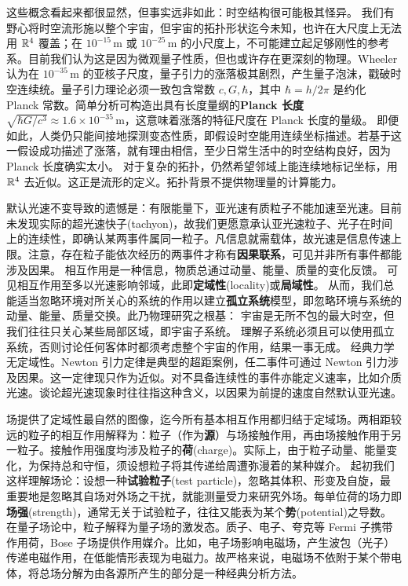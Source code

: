 这些概念看起来都很显然，但事实远非如此：时空结构很可能极其怪异。
我们有野心将时空流形施以整个宇宙，但宇宙的拓扑形状迄今未知，也许在大尺度上无法用 $\mathbb{R}^4$ 覆盖；在 $10^{-15}$\,m 或 $10^{-25}$\,m 的小尺度上，不可能建立起足够刚性的参考系。目前我们认为这是因为微观量子性质，但也或许存在更深刻的物理。Wheeler 认为在 $10^{-35}$\,m 的亚核子尺度，量子引力的涨落极其剧烈，产生量子泡沫，戳破时空连续统。量子引力理论必须一致包含常数 $c,G,\hbar$，其中 $\hbar=h/2\pi$ 是约化 Planck 常数。简单分析可构造出具有长度量纲的\textbf{Planck 长度} $\sqrt{\hbar G/c^3}\approx 1.6\times10^{-35}$\,m，这意味着涨落的特征尺度在 Planck 长度的量级。
即便如此，人类仍只能间接地探测变态性质，即假设时空能用连续坐标描述。若基于这一假设成功描述了涨落，就有理由相信，至少日常生活中的时空结构良好，因为 Planck 长度确实太小。
对于复杂的拓扑，仍然希望邻域上能连续地标记坐标，用 $\mathbb{R}^4$ 去近似。这正是流形的定义。拓扑背景不提供物理量的计算能力。

默认光速不变导致的遗憾是：有限能量下，亚光速有质粒子不能加速至光速。目前未发现实际的超光速快子(tachyon)，故我们更愿意承认亚光速粒子、光子在时间上的连续性，即确认某两事件属同一粒子。凡信息就需载体，故光速是信息传速上限。注意，存在粒子能依次经历的两事件才称有\textbf{因果联系}，可见并非所有事件都能涉及因果。
相互作用是一种信息，物质总通过动量、能量、质量的变化反馈。
可见相互作用至多以光速影响邻域，此即\textbf{定域性}(locality)或\textbf{局域性}。
从而，我们总能适当忽略环境对所关心的系统的作用以建立\textbf{孤立系统}模型，即忽略环境与系统的动量、能量、质量交换。此乃物理研究之根基：
宇宙是无所不包的最大时空，但我们往往只关心某些局部区域，即宇宙子系统。
理解子系统必须且可以使用孤立系统，否则讨论任何客体时都须考虑整个宇宙的作用，结果一事无成。
经典力学无定域性。Newton 引力定律是典型的超距案例，任二事件可通过 Newton 引力涉及因果。这一定律现只作为近似。对不具备连续性的事件亦能定义速率，比如介质光速。谈论超光速现象时往往指这种含义，以因果为前提的速度自然默认亚光速。

场提供了定域性最自然的图像，迄今所有基本相互作⽤都归结于定域场。两相距较远的粒子的相互作⽤解释为：粒子（作为\textbf{源}）与场接触作用，再由场接触作用于另一粒子。接触作用强度均涉及粒子的\textbf{荷}(charge)。实际上，由于粒子动量、能量变化，为保持总和守恒，须设想粒子将其传递给周遭弥漫着的某种媒介。
起初我们这样理解场论：设想一种\textbf{试验粒子}(test particle)，忽略其体积、形变及自旋，最重要地是忽略其自场对外场之干扰，就能测量受力来研究外场。每单位荷的场力即\textbf{场强}(strength)，通常无关于试验粒子，往往又能表为某个\textbf{势}(potential)之导数。
在量子场论中，粒子解释为量子场的激发态。质子、电子、夸克等 Fermi 子携带作用荷，Bose 子场提供作用媒介。比如，电子场影响电磁场，产生波包（光子）传递电磁作用，在低能情形表现为电磁力。故严格来说，电磁场不依附于某个带电体，将总场分解为由各源所产生的部分是一种经典分析方法。

